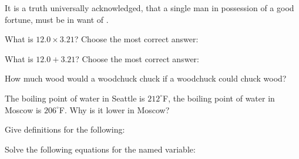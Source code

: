 \documentclass[11pt,addpoints]{exam}   	%
\begin{document}
\begin{questions}
\vspace{.2in}


\question[1]
It is a truth universally acknowledged, that a single man in possession of a good fortune, must be in want of \fillin[a wife].
\vspace{.2in}

\pagebreak

\question[2]
What is $ 12.0 \times 3.21 $? Choose the most correct answer:

\begin{choices}
\end{choices}
\vspace{.2in}

\question[2]
What is $ 12.0 + 3.21 $? Choose the most correct answer:

\begin{choices}
\end{choices}
\vspace{.2in}

\question[1]
How much wood would a woodchuck chuck if a woodchuck could chuck wood?
\vspace{.2in}

\question[1]
The boiling point of water in Seattle is $212^{\circ}$F, the boiling point of water in Moscow is $206^{\circ}$F. Why is it lower in Moscow?
\vspace{.2in}

\question
Give definitions for the following:

\question
Solve the following equations for the named variable:
\begin{parts}

\end{parts}
\end{questions}
\end{document}
